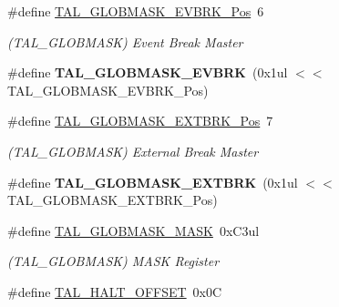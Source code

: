 \begin{DoxyCompactItemize}
\item 
\hypertarget{group___s_a_m_l21___t_a_l_ga9375f969092f361aa66e586b9cd008fb}{}\#define \hyperlink{group___s_a_m_l21___t_a_l_ga9375f969092f361aa66e586b9cd008fb}{T\+A\+L\+\_\+\+G\+L\+O\+B\+M\+A\+S\+K\+\_\+\+E\+V\+B\+R\+K\+\_\+\+Pos}~6\label{group___s_a_m_l21___t_a_l_ga9375f969092f361aa66e586b9cd008fb}

\begin{DoxyCompactList}\small\item\em (T\+A\+L\+\_\+\+G\+L\+O\+B\+M\+A\+S\+K) Event Break Master \end{DoxyCompactList}\item 
\hypertarget{group___s_a_m_l21___t_a_l_gaeb0e90d3cd69427f5bcada397cf958b9}{}\#define {\bfseries T\+A\+L\+\_\+\+G\+L\+O\+B\+M\+A\+S\+K\+\_\+\+E\+V\+B\+R\+K}~(0x1ul $<$$<$ T\+A\+L\+\_\+\+G\+L\+O\+B\+M\+A\+S\+K\+\_\+\+E\+V\+B\+R\+K\+\_\+\+Pos)\label{group___s_a_m_l21___t_a_l_gaeb0e90d3cd69427f5bcada397cf958b9}

\item 
\hypertarget{group___s_a_m_l21___t_a_l_ga43e68f25db5169f76279ecbfecd2dc79}{}\#define \hyperlink{group___s_a_m_l21___t_a_l_ga43e68f25db5169f76279ecbfecd2dc79}{T\+A\+L\+\_\+\+G\+L\+O\+B\+M\+A\+S\+K\+\_\+\+E\+X\+T\+B\+R\+K\+\_\+\+Pos}~7\label{group___s_a_m_l21___t_a_l_ga43e68f25db5169f76279ecbfecd2dc79}

\begin{DoxyCompactList}\small\item\em (T\+A\+L\+\_\+\+G\+L\+O\+B\+M\+A\+S\+K) External Break Master \end{DoxyCompactList}\item 
\hypertarget{group___s_a_m_l21___t_a_l_ga4712908d7eaa3e379a5d3045ba093b3b}{}\#define {\bfseries T\+A\+L\+\_\+\+G\+L\+O\+B\+M\+A\+S\+K\+\_\+\+E\+X\+T\+B\+R\+K}~(0x1ul $<$$<$ T\+A\+L\+\_\+\+G\+L\+O\+B\+M\+A\+S\+K\+\_\+\+E\+X\+T\+B\+R\+K\+\_\+\+Pos)\label{group___s_a_m_l21___t_a_l_ga4712908d7eaa3e379a5d3045ba093b3b}

\item 
\hypertarget{group___s_a_m_l21___t_a_l_ga2712d133e41603786365a3c21ee2d085}{}\#define \hyperlink{group___s_a_m_l21___t_a_l_ga2712d133e41603786365a3c21ee2d085}{T\+A\+L\+\_\+\+G\+L\+O\+B\+M\+A\+S\+K\+\_\+\+M\+A\+S\+K}~0x\+C3ul\label{group___s_a_m_l21___t_a_l_ga2712d133e41603786365a3c21ee2d085}

\begin{DoxyCompactList}\small\item\em (T\+A\+L\+\_\+\+G\+L\+O\+B\+M\+A\+S\+K) M\+A\+S\+K Register \end{DoxyCompactList}\item 
\hypertarget{group___s_a_m_l21___t_a_l_ga93b4caa58af48108cc18b819f0ec0cb3}{}\#define \hyperlink{group___s_a_m_l21___t_a_l_ga93b4caa58af48108cc18b819f0ec0cb3}{T\+A\+L\+\_\+\+H\+A\+L\+T\+\_\+\+O\+F\+F\+S\+E\+T}~0x0\+C\label{group___s_a_m_l21___t_a_l_ga93b4caa58af48108cc18b819f0ec0cb3}


\end{DoxyCompactItemize}
